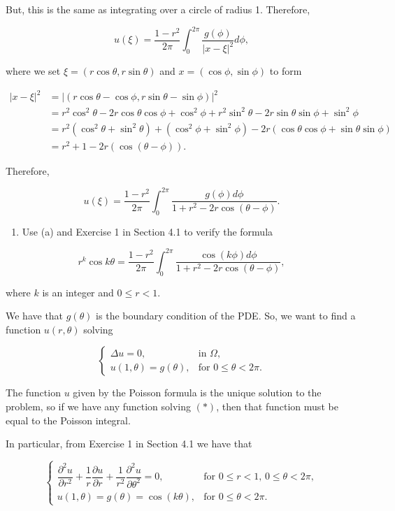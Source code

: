 \documentclass{article}
\begin{document}
But, this is the same as integrating over a circle of radius 1. Therefore,

$$u(\xi)=\frac{1-r^2}{2\pi}\int_0^{2\pi}\frac{g(\phi)}{|x-\xi|^2}d\phi,$$

where we set $\xi=(r\cos\theta,r\sin\theta)$ and $x=(\cos\phi,\sin\phi)$ to form

\begin{equation*}
\begin{split}
|x-\xi|^2&=|(r\cos\theta-\cos\phi,r\sin\theta-\sin\phi)|^2 \\&=
r^2\cos^2\theta-2r\cos\theta\cos\phi+\cos^2\phi + r^2\sin^2\theta-2r\sin\theta\sin\phi+\sin^2\phi \\&=
r^2(\cos^2\theta+\sin^2\theta)+(\cos^2\phi+\sin^2\phi)-2r(\cos\theta\cos\phi+\sin\theta\sin\phi) \\&=
r^2+1-2r(\cos(\theta-\phi)).
\end{split}
\end{equation*}

Therefore,

$$u(\xi)=\frac{1-r^2}{2\pi}\int_0^{2\pi}\frac{g(\phi)d\phi}{1+r^2-2r\cos(\theta-\phi)}.$$

\begin{enumerate}[label=(\alph*),start=2]
    \item Use (a) and Exercise 1 in Section 4.1 to verify the formula
\end{enumerate}

$$r^k\cos k\theta=\frac{1-r^2}{2\pi}\int_0^{2\pi}\frac{\cos (k\phi)d\phi}{1+r^2-2r\cos(\theta-\phi)},$$

where $k$ is an integer and $0\leq r < 1$.

We have that $g(\theta)$ is the boundary condition of the PDE. So, we want to find a function $u(r,\theta)$ solving

\[
  \begin{cases}
  \Delta u = 0, & \text{in $\Omega$}, \\
  u(1,\theta) =g(\theta), & \text{for $0\leq \theta < 2\pi$}.
  \end{cases}\tag{*}
\]

The function $u$ given by the Poisson formula is the unique solution to the problem, so if we have any function solving $(*)$, then that function must be equal to the Poisson integral.

In particular, from Exercise 1 in Section 4.1 we have that

\[
  \begin{cases}
  \dfrac{\partial^2 u}{\partial r^2} + \dfrac{1}{r}\dfrac{\partial u}{\partial r} + \dfrac{1}{r^2}\dfrac{\partial^2 u}{\partial \theta^2}=0, & \text{for $0\leq r < 1$, $0\leq \theta< 2\pi$}, \\
  u(1,\theta) =g(\theta)=\cos(k\theta), & \text{for $0\leq \theta < 2\pi$}.
  \end{cases}
\]
\end{document}
